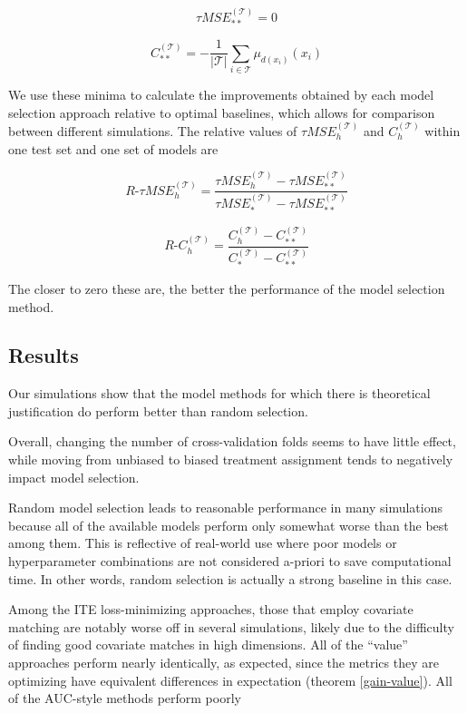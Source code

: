 \[
\tau MSE^{(\mathcal{T})}_{**} = 0
\]

\[
C^{(\mathcal{T})}_{**} = -\frac{1}{|\mathcal{T}|}\sum_{i \in \mathcal{T}} \mu_{ d(x_i)}(x_i)
\]

We use these minima to calculate the improvements obtained by each model selection approach relative to optimal baselines, which allows for comparison between different simulations. The relative values of $\tau MSE^{(\mathcal{T})}_{h}$ and $C^{(\mathcal{T})}_{h}$ within one test set and one set of models are

\[
	R\text{-} \tau MSE^{(\mathcal{T})}_{h} = 
	\frac{\tau MSE^{(\mathcal{T})}_{h} - \tau MSE^{(\mathcal{T})}_{**}}{\tau MSE^{(\mathcal{T})}_{*} - \tau MSE^{(\mathcal{T})}_{**}}
\]

\[
	R\text{-}  C^{(\mathcal{T})}_{h} = 
	\frac{ C^{(\mathcal{T})}_{h} -  C^{(\mathcal{T})}_{**}}{ C^{(\mathcal{T})}_{*} -  C^{(\mathcal{T})}_{**}}
\]

The closer to zero these are, the better the performance of the model selection method.

\subsection{Results}

Our simulations show that the model methods for which there is theoretical justification do perform better than random selection. 

Overall, changing the number of cross-validation folds seems to have little effect, while moving from unbiased to biased treatment assignment tends to negatively impact model selection. 

Random model selection leads to reasonable performance in many simulations because all of the available models perform only somewhat worse than the best among them. This is reflective of real-world use where poor models or hyperparameter combinations are not considered a-priori to save computational time. In other words, random selection is actually a strong baseline in this case.

Among the ITE loss-minimizing approaches, those that employ covariate matching are notably worse off in several simulations, likely due to the difficulty of finding good covariate matches in high dimensions. All of the ``value'' approaches perform nearly identically, as expected, since the metrics they are optimizing have equivalent differences in expectation (theorem \ref{gain-value}). All of the AUC-style methods perform poorly

